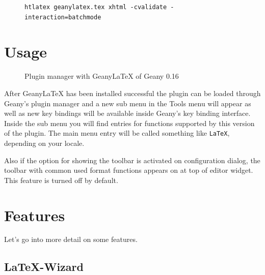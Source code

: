 \documentclass[%
a4paper,%
10pt,%
oneside,%
DIV18,
headsepline,
plainheadsepline,
footsepline,
plainfootsepline,
bibtotoc,%
liststotoc,%
BCOR12mm,%
halfparskip,%
openany,%
]{scrartcl}
\begin{document}
\begin{figure}[h!]
\begin{lstlisting}
htlatex geanylatex.tex xhtml -cvalidate -interaction=batchmode
\end{lstlisting}
\end{figure}

\section{Usage}
\begin{figure}[h!]
	\caption{Plugin manager with Geany\LaTeX{} of Geany 0.16}
\end{figure}

After Geany\LaTeX{} has been installed successful the plugin can be
loaded through Geany's plugin manager and a new sub menu in the Tools
menu will appear as well as new key bindings will be available inside
Geany's key binding interface. Inside the sub menu you will find entries
for functions supported by this version of the plugin. The main menu entry
will be called something like \texttt{LaTeX}, depending on your locale.

Also if the option for showing the toolbar is activated on configuration
dialog, the toolbar with common used format functions appears on at top
of editor widget. This feature is turned off by default.


\section{Features}

Let's go into more detail on some features.


\subsection{\LaTeX-Wizard}
\end{document}
